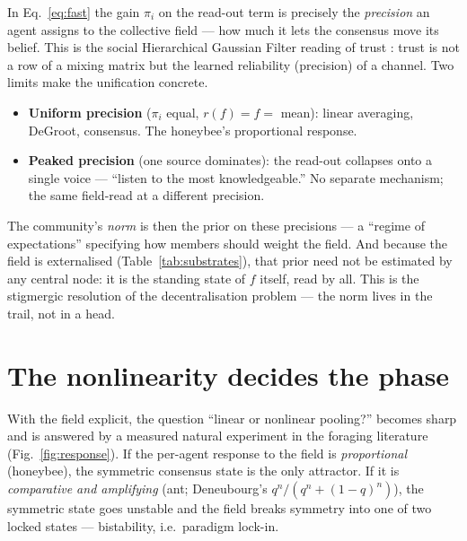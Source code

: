 \documentclass[11pt,a4paper]{article}
\theoremstyle{plain}
\begin{document}
In Eq.~\eqref{eq:fast} the gain $\pi_i$ on the read-out term is precisely the
\emph{precision} an agent assigns to the collective field --- how much it
lets the consensus move its belief. This is the social Hierarchical
Gaussian Filter reading of trust \cite{Diaconescu2017}: trust is not a row
of a mixing matrix but the learned reliability (precision) of a channel.
Two limits make the unification concrete.
\begin{itemize}
\item \textbf{Uniform precision} ($\pi_i$ equal, $r(f)=f=$ mean): linear
  averaging, DeGroot, consensus. The honeybee's proportional response.
\item \textbf{Peaked precision} (one source dominates): the read-out
  collapses onto a single voice --- ``listen to the most knowledgeable.''
  No separate mechanism; the same field-read at a different precision.
\end{itemize}
The community's \emph{norm} is then the prior on these precisions --- a
``regime of expectations'' \cite{TTOM2020} specifying how members should
weight the field. And because the field is externalised (Table~\ref{tab:substrates}),
that prior need not be estimated by any central node: it is the standing
state of $f$ itself, read by all. This is the stigmergic resolution of the
decentralisation problem --- the norm lives in the trail, not in a head.

\section{The nonlinearity decides the phase}
\label{sec:phase}

With the field explicit, the question ``linear or nonlinear pooling?''
becomes sharp and is answered by a measured natural experiment in the
foraging literature (Fig.~\ref{fig:response}). If the per-agent response to
the field is \emph{proportional} (honeybee), the symmetric consensus state
is the only attractor. If it is \emph{comparative and amplifying}
(ant; Deneubourg's $q^n/(q^n+(1-q)^n)$), the symmetric state goes unstable
and the field breaks symmetry into one of two locked states --- bistability,
i.e.\ paradigm lock-in.
\end{document}
